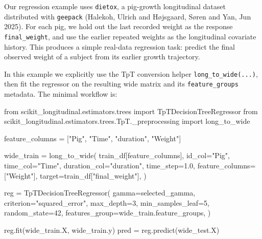 \documentclass[
  letterpaper,
  DIV=11,
  numbers=noendperiod]{scrartcl}
\newenvironment{Shaded}{\begin{snugshade}}{\end{snugshade}}
\newcommand{\DecValTok}[1]{\textcolor[rgb]{0.68,0.00,0.00}{#1}}
\newcommand{\FloatTok}[1]{\textcolor[rgb]{0.68,0.00,0.00}{#1}}
\newcommand{\ImportTok}[1]{\textcolor[rgb]{0.00,0.46,0.62}{#1}}
\newcommand{\NormalTok}[1]{\textcolor[rgb]{0.00,0.23,0.31}{#1}}
\newcommand{\OperatorTok}[1]{\textcolor[rgb]{0.37,0.37,0.37}{#1}}
\newcommand{\StringTok}[1]{\textcolor[rgb]{0.13,0.47,0.30}{#1}}
\begin{document}
Our regression example uses \texttt{dietox}, a pig-growth longitudinal
dataset distributed with \texttt{geepack} (Halekoh, Ulrich and
Højsgaard, Søren and Yan, Jun 2025). For each pig, we hold out the last
recorded weight as the response \texttt{final\_weight}, and use the
earlier repeated weights as the longitudinal covariate history. This
produces a simple real-data regression task: predict the final observed
weight of a subject from its earlier growth trajectory.

In this example we explicitly use the TpT conversion helper
\texttt{long\_to\_wide(...)}, then fit the regressor on the resulting
wide matrix and its \texttt{feature\_groups} metadata. The minimal
workflow is:

\begin{Shaded}
\begin{Highlighting}[]
\ImportTok{from}\NormalTok{ scikit\_longitudinal.estimators.trees }\ImportTok{import}\NormalTok{ TpTDecisionTreeRegressor}
\ImportTok{from}\NormalTok{ scikit\_longitudinal.estimators.trees.TpT.\_preprocessing }\ImportTok{import}\NormalTok{ long\_to\_wide}

\NormalTok{feature\_columns }\OperatorTok{=}\NormalTok{ [}\StringTok{"Pig"}\NormalTok{, }\StringTok{"Time"}\NormalTok{, }\StringTok{"duration"}\NormalTok{, }\StringTok{"Weight"}\NormalTok{]}

\NormalTok{wide\_train }\OperatorTok{=}\NormalTok{ long\_to\_wide(}
\NormalTok{    train\_df[feature\_columns],}
\NormalTok{    id\_col}\OperatorTok{=}\StringTok{"Pig"}\NormalTok{,}
\NormalTok{    time\_col}\OperatorTok{=}\StringTok{"Time"}\NormalTok{,}
\NormalTok{    duration\_col}\OperatorTok{=}\StringTok{"duration"}\NormalTok{,}
\NormalTok{    time\_step}\OperatorTok{=}\FloatTok{1.0}\NormalTok{,}
\NormalTok{    feature\_columns}\OperatorTok{=}\NormalTok{[}\StringTok{"Weight"}\NormalTok{],}
\NormalTok{    target}\OperatorTok{=}\NormalTok{train\_df[}\StringTok{"final\_weight"}\NormalTok{],}
\NormalTok{)}

\NormalTok{reg }\OperatorTok{=}\NormalTok{ TpTDecisionTreeRegressor(}
\NormalTok{    gamma}\OperatorTok{=}\NormalTok{selected\_gamma,}
\NormalTok{    criterion}\OperatorTok{=}\StringTok{"squared\_error"}\NormalTok{,}
\NormalTok{    max\_depth}\OperatorTok{=}\DecValTok{3}\NormalTok{,}
\NormalTok{    min\_samples\_leaf}\OperatorTok{=}\DecValTok{5}\NormalTok{,}
\NormalTok{    random\_state}\OperatorTok{=}\DecValTok{42}\NormalTok{,}
\NormalTok{    features\_group}\OperatorTok{=}\NormalTok{wide\_train.feature\_groups,}
\NormalTok{)}

\NormalTok{reg.fit(wide\_train.X, wide\_train.y)}
\NormalTok{pred }\OperatorTok{=}\NormalTok{ reg.predict(wide\_test.X)}
\end{Highlighting}
\end{Shaded}
\end{document}
